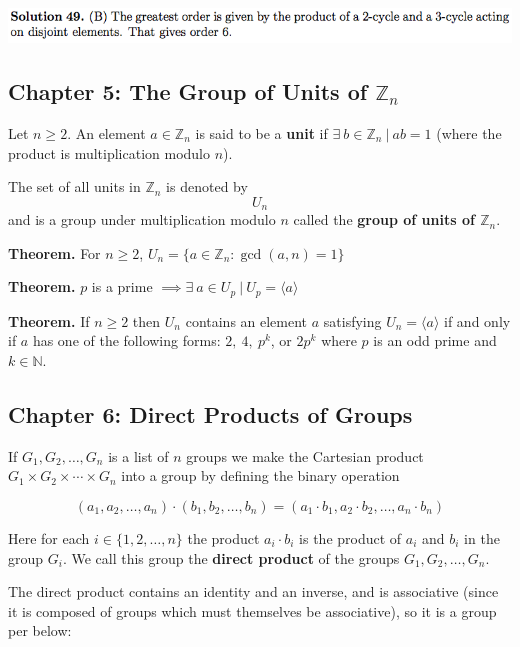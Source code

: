 \documentclass{article}
\begin{document}
\includegraphics[scale=0.65]{1268_49s}

\pagebreak
\subsection{Chapter 5: The Group of Units of \(\mathbb{Z}_n\)}

Let \(n \geq 2\). An element \(a \in \mathbb{Z}_n\) is said to be a \textbf{unit} if \(\exists \ b \in \mathbb{Z}_n \ | \ ab = 1\) (where the product is multiplication modulo \(n\)). 

The set of all units in \(\mathbb{Z}_n\) is denoted by \[U_n\] and is a group under multiplication modulo \(n\) called the \textbf{group of units of \(\mathbb{Z}_n\)}.

\textbf{Theorem.} For \(n \geq 2 \), \(U_n = \{a \in \mathbb{Z}_n: \gcd(a, n) = 1 \} \)

\textbf{Theorem.} \(p\) is a prime \(\implies \exists \ a \in U_p \ | \ U_p = \langle a \rangle\)

\textbf{Theorem.} If \(n \geq 2\) then \(U_n\) contains an element \(a\) satisfying \(U_n = \langle a \rangle\) if and only if \(a\) has one of the following forms: \(2, \ 4, \ p^k\), or \(2p^k\) where \(p\) is an odd prime and \(k \in \mathbb{N}\).

\subsection{Chapter 6: Direct Products of Groups}

If \(G_1, G_2, \ldots, G_n\) is a list of \(n\) groups we make the Cartesian product \(G_1 \times G_2 \times \cdots \times G_n\) into a group by defining the binary operation

\[
(a_1, a_2, \ldots, a_n) \cdot (b_1, b_2, \ldots, b_n) = (a_1 \cdot b_1, a_2 \cdot b_2, \ldots, a_n \cdot b_n)
\]

Here for each \(i \in \{1, 2, \ldots, n\}\) the product \(a_i \cdot b_i\) is the product of \(a_i\) and \(b_i\) in the group \(G_i\). We call this group the \textbf{direct product} of the groups \(G_1, G_2, \ldots, G_n\).

The direct product contains an identity and an inverse, and is associative (since it is composed of groups which must themselves be associative), so it is a group per below:
\end{document}

